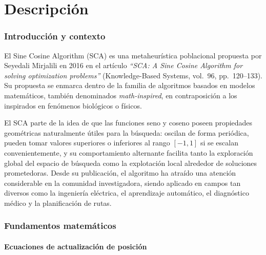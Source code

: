 \documentclass[12pt,a4paper]{article}
\begin{document}
\portada[%
        titulo=Metaheurísticas,
        subtitulo=Trabajo final:\\ Sine Cosine Algorithm (SCA),
        autor=Jesús Muñoz Velasco,
        año=Curso 2025-2026]
        
    \thispagestyle{empty}
    \tableofcontents
    \newpage
    \thispagestyle{empty}

\part{Descripción}\label{part:descripcion}

\section{Introducción y contexto}

El {Sine Cosine Algorithm} (SCA) es una metaheurística poblacional propuesta por Seyedali Mirjalili en 2016 en el artículo \textit{``SCA: A Sine Cosine Algorithm for solving optimization problems''} (Knowledge-Based Systems, vol.~96, pp.~120--133). Su propuesta se enmarca dentro de la familia de algoritmos basados en modelos matemáticos, también denominados \textit{math-inspired}, en contraposición a los inspirados en fenómenos biológicos o físicos.

El SCA parte de la idea de que las funciones seno y coseno poseen propiedades geométricas naturalmente útiles para la búsqueda: oscilan de forma periódica, pueden tomar valores superiores o inferiores al rango $[-1,1]$ si se escalan convenientemente, y su comportamiento alternante facilita tanto la exploración global del espacio de búsqueda como la explotación local alrededor de soluciones prometedoras. Desde su publicación, el algoritmo ha atraído una atención considerable en la comunidad investigadora, siendo aplicado en campos tan diversos como la ingeniería eléctrica, el aprendizaje automático, el diagnóstico médico y la planificación de rutas.

\section{Fundamentos matemáticos}
\subsection{Ecuaciones de actualización de posición}
\end{document}
